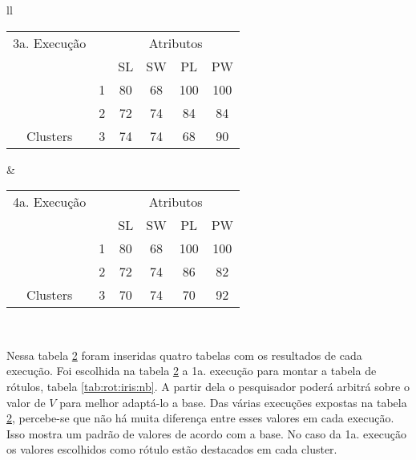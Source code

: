 \begin{table}[!h]
\begin{tabular}{ll}
   \small\addtolength{\tabcolsep}{-1pt}
     \begin{tabular}{|cl|c|c|c|c|}
        \hline \hline
         3a. Execução           &   & \multicolumn{4}{c|}{Atributos}                                               \\ \cline{3-6} 
       \multicolumn{1}{|l}{}                             &   & SL   & SW     & PL    & PW      \\ \hline
        \multicolumn{1}{|c|}{}                           & 1 & 80 & 68   & 100  & 100       \\ \cline{2-6} 
        \multicolumn{1}{|c|}{}                           & 2 & 72 & 74   & 84  &  84    \\ \cline{2-6} 
        \multicolumn{1}{|c|}{\multirow{-3}{*}{Clusters}} & 3 & 74 & 74   & 68  &   90   \\ \hline
      \end{tabular}
    
    &
    
 \small\addtolength{\tabcolsep}{-1pt}
     \begin{tabular}{|cl|c|c|c|c|}
        \hline \hline
        4a. Execução      &   & \multicolumn{4}{c|}{Atributos}                                               \\ \cline{3-6} 
       \multicolumn{1}{|l}{}                             &   & SL   & SW     & PL    & PW      \\ \hline
        \multicolumn{1}{|c|}{}                           & 1 & 80 & 68   & 100  &   100     \\ \cline{2-6} 
        \multicolumn{1}{|c|}{}                           & 2 & 72 & 74   & 86  &   82   \\ \cline{2-6} 
        \multicolumn{1}{|c|}{\multirow{-3}{*}{Clusters}} & 3 & 70 & 74   & 70  & 92     \\ \hline
      \end{tabular}
   \\
 
 \end{tabular}
 \label{tab:execucoes:iris:nb}
\end{table}

Nessa tabela \ref{tab:execucoes:iris:nb} foram inseridas quatro tabelas com os resultados de cada execução. Foi escolhida na tabela \ref{tab:execucoes:iris:nb} a 1a. execução para montar a tabela de rótulos, tabela \ref{tab:rot:iris:nb}. A partir dela o pesquisador poderá arbitrá sobre o valor de ${V}$ para melhor adaptá-lo a base.
Das várias execuções expostas na tabela \ref{tab:execucoes:iris:nb}, percebe-se que não há muita diferença entre esses valores em cada execução. Isso mostra um padrão de valores de acordo com a base. No caso da 1a. execução os valores escolhidos como rótulo estão destacados em cada cluster.

